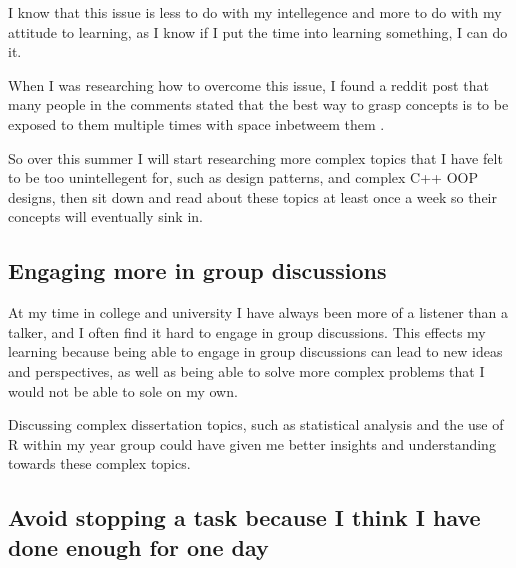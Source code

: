 \documentclass{scrartcl}
\begin{document}
I know that this issue is less to do with my intellegence and more to do with my attitude to learning, as I know if I put the time into learning something, I can do it.

When I was researching how to overcome this issue, I found a reddit post that many people in the comments stated that the best way to grasp concepts is to be exposed to them multiple times with space inbetweem them \cite{Reddit}.

So over this summer I will start researching more complex topics that I have felt to be too unintellegent for, such as design patterns, and complex C++ OOP designs, then sit down and read about these topics at least once a week so their concepts will eventually sink in.



\subsection{Engaging more  in group discussions}

At my time in college and university I have always been more of a listener than a talker, and I often find it hard to engage in group discussions. This effects my learning because being able to engage in group discussions can lead to new ideas and perspectives, as well as being able to solve more complex problems that I would not be able to sole on my own.

Discussing complex dissertation topics, such as statistical analysis and the use of R within my year group could have given me better insights and understanding towards these complex topics.




\par






\subsection{Avoid stopping a task because I think I have done enough for one day}
\end{document}
